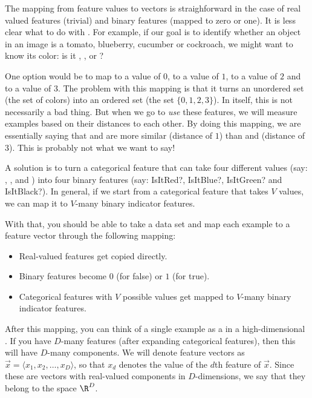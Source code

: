 The mapping from feature values to vectors is straighforward in the
case of real valued features (trivial) and binary features (mapped to
zero or one).  It is less clear what to do with . For example, if our goal is to identify whether an object
in an image is a tomato, blueberry, cucumber or cockroach, we might
want to know its color: is it , , 
or ?

One option would be to map  to a value of $0$, 
to a value of $1$,  to a value of $2$ and 
to a value of $3$.  The problem with this mapping is that it turns an
unordered set (the set of colors) into an ordered set (the set
$\{0,1,2,3\}$).  In itself, this is not necessarily a bad thing.  But
when we go to \emph{use} these features, we will measure examples
based on their distances to each other.  By doing this mapping, we are
essentially saying that  and  are more similar
(distance of $1$) than  and  (distance of
$3$).  This is probably not what we want to say!

A solution is to turn a categorical feature that can take four
different values (say: , ,  and
) into four binary features (say: IsItRed?, IsItBlue?,
IsItGreen? and IsItBlack?).  In general, if we start from a
categorical feature that takes $V$ values, we can map it to $V$-many
binary indicator features.


With that, you should be able to take a data set and map each example
to a feature vector through the following mapping:

\begin{itemize}
\item Real-valued features get copied directly.
\item Binary features become $0$ (for false) or $1$ (for true).
\item Categorical features with $V$ possible values get mapped to
  $V$-many binary indicator features.
\end{itemize}

After this mapping, you can think of a single example as a
 in a high-dimensional .  If
you have $D$-many features (after expanding categorical features),
then this  will have $D$-many components.  We
will denote feature vectors as $\vec x = \langle x_1, x_2, \dots, x_D
\rangle$, so that $x_d$ denotes the value of the $d$th feature of
$\vec x$.  Since these are vectors with real-valued components in
$D$-dimensions, we say that they belong to the space $\R^D$.

